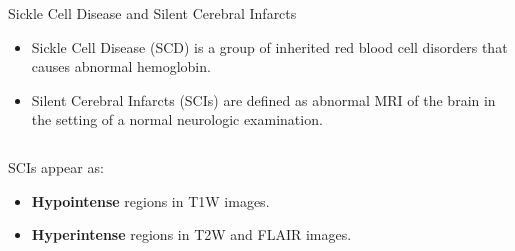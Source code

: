 \documentclass[]{standalone}
\begin{document}
	\begin{frame}{Sickle Cell Disease and Silent Cerebral Infarcts}{}
	\vspace{-5pt}
	\begin{itemize}
		\item Sickle Cell Disease (SCD) is a group of inherited red blood cell disorders that causes abnormal hemoglobin.
		
		\item Silent Cerebral Infarcts (SCIs) are defined as abnormal MRI of the brain in the setting of a normal neurologic examination.
	\end{itemize}
	\begin{columns}
		\begin{column}{0.25\textwidth}
		\scriptsize
		SCIs appear as:
			\begin{itemize}
			\item \textbf{Hypointense} regions in T1W images.
			\item \textbf{Hyperintense} regions in T2W and FLAIR images.
			\end{itemize}
			
		\end{column}
		

\end{columns}
\end{frame}
\end{document}

